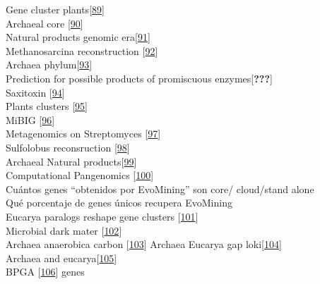 \documentclass[12pt,twoside]{reedthesis}
\begin{document}
  Gene cluster
  plants{[}\protect\hyperlink{ref-osbournux5fgeneux5f2010}{89}{]}\\
  Archaeal core
  {[}\protect\hyperlink{ref-makarovaux5fcomparativeux5f1999}{90}{]}\\
  Natural products genomic
  era{[}\protect\hyperlink{ref-harveyux5fre-emergenceux5f2015}{91}{]}\\
  Methanosarcina reconstruction
  {[}\protect\hyperlink{ref-benedictux5fgenome-scaleux5f2012}{92}{]}\\
  Archaea
  phylum{[}\protect\hyperlink{ref-seitzux5fgenomicux5f2016}{93}{]}\\
  Prediction for possible products of promiscuous
  enzymes{[}\textbf{???}{]}\\
  Saxitoxin {[}\protect\hyperlink{ref-moustafaux5foriginux5f2009}{94}{]}\\
  Plants clusters
  {[}\protect\hyperlink{ref-medemaux5fcomputationalux5f2016}{95}{]}\\
  MiBIG {[}\protect\hyperlink{ref-medemaux5fminimumux5f2015}{96}{]}\\
  Metagenomics on Streptomyces
  {[}\protect\hyperlink{ref-iqbalux5fnaturalux5f2016}{97}{]}\\
  Sulfolobus reconsruction
  {[}\protect\hyperlink{ref-ulasux5fgenome-scaleux5f2012}{98}{]}\\
  Archaeal Natural
  products{[}\protect\hyperlink{ref-charlesworthux5funtappedux5f2015}{99}{]}\\
  Computational Pangenomics
  {[}\protect\hyperlink{ref-computationalux5fpan-genomicsux5fconsortiumux5fcomputationalux5f2016}{100}{]}\\
  Cuántos genes ``obtenidos por EvoMining'' son core/ cloud/stand alone\\
  Qué porcentaje de genes únicos recupera EvoMining\\
  Eucarya paralogs reshape gene clusters
  {[}\protect\hyperlink{ref-chanux5fremodellingux5f2015}{101}{]}\\
  Microbial dark mater
  {[}\protect\hyperlink{ref-rinkeux5finsightsux5f2013}{102}{]}\\
  Archaea anaerobica carbon
  {[}\protect\hyperlink{ref-castelleux5fgenomicux5f2015}{103}{]} Archaea
  Eucarya gap
  loki{[}\protect\hyperlink{ref-spangux5fcomplexux5f2015}{104}{]}\\
  Archaea and
  eucarya{[}\protect\hyperlink{ref-kooninux5farchaealux5f2015}{105}{]}\\
  BPGA {[}\protect\hyperlink{ref-chaudhariux5fbpga-ux5f2016}{106}{]} genes
\end{document}
